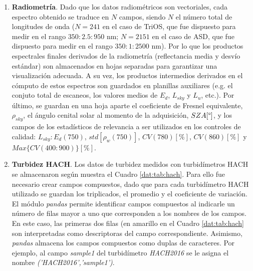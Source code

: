         \begin{enumerate}
            \item \textbf{Radiometría}. Dado que los datos radiométricos son vectoriales, cada espectro obtenido se traduce en $N$ campos, siendo $N$ el número total de longitudes de onda ($N=241$ en el caso de TriOS, que fue dispuesto para medir en el rango $350:2.5:950$ nm; $N=2151$ en el caso de ASD, que fue dispuesto para medir en el rango $350:1:2500$ nm). Por lo que los productos espectrales finales derivados de la radiometría (reflectancia media y desvío estándar) son almacenados en hojas separadas para garantizar una visualización adecuada. A su vez, los productos intermedios derivados en el cómputo de estos espectros son guardados en planillas auxiliares (e.g. el conjuto total de escaneos, los valores medios de $E_{d}$, $L_{sky}$ y $L_{u}$, etc.). Por último, se guardan en una hoja aparte el coeficiente de Fresnel equivalente, $\rho_{sky}$, el ángulo cenital solar al momento de la adquisición, $SZA [\degree]$, y los campos de los estadísticos de relevancia a ser utilizados en los controles de calidad: $L_{sky}:E_{d}(750)$, $std[\rho_{w}(750)]$, $CV(780) [\%]$,	$CV(860) [\%]$ y $Max\{CV(400:900)\} [\%]$.	
            \item \textbf{Turbidez HACH}. Los datos de turbidez medidos con turbidímetros HACH se almacenaron según muestra el Cuadro \ref{dat:tab:hach}. Para ello fue necesario crear campos compuestos, dado que para cada turbidímetro HACH utilizado se guardan los triplicados, el promedio y el coeficiente de variación. El módulo \textit{pandas} permite identificar campos compuestos al indicarle un número de filas mayor a uno que corresponden a los nombres de los campos. En este caso, las primeras dos filas (en amarillo en el Cuadro \ref{dat:tab:hach} son interpretadas como descriptoras del campo correspondiente. Asimismo, \textit{pandas} almacena los campos compuestos como duplas de caracteres. Por ejemplo, al campo \textit{sample1} del turbidímetro \textit{HACH2016} se le asigna el nombre \textit{('HACH2016','sample1')}.
        \end{enumerate}


